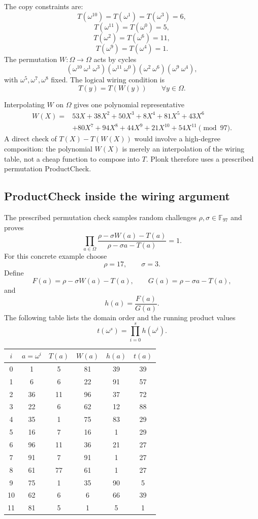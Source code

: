 \documentclass[11pt]{article}
\newcommand{\F}{\mathbb{F}}
\begin{document}
The copy constraints are:
\[
T(\omega^{10})=T(\omega^1)=T(\omega^3)=6,
\]
\[
T(\omega^{11})=T(\omega^0)=5,
\]
\[
T(\omega^2)=T(\omega^6)=11,
\]
\[
T(\omega^9)=T(\omega^4)=1.
\]
The permutation $W:\Omega\to\Omega$ acts by cycles
\[
    (\omega^{10}\ \omega^1\ \omega^3)
    (\omega^{11}\ \omega^0)
    (\omega^2\ \omega^6)
    (\omega^9\ \omega^4),
\]
with $\omega^5,\omega^7,\omega^8$ fixed. The logical wiring condition is
\[
    T(y)=T(W(y))
    \qquad\forall y\in\Omega.
\]

Interpolating $W$ on $\Omega$ gives one polynomial representative
\[
\begin{aligned}
W(X)={}&53X+38X^2+50X^3+8X^4+81X^5+43X^6\\
&+80X^7+94X^8+44X^9+21X^{10}+54X^{11}
\pmod{97}.
\end{aligned}
\]
A direct check of $T(X)-T(W(X))$ would involve a high-degree composition: the polynomial $W(X)$ is merely an interpolation of the wiring table, not a cheap function to compose into $T$. Plonk therefore uses a prescribed permutation ProductCheck.

\subsection{ProductCheck inside the wiring argument}

The prescribed permutation check samples random challenges $\rho,\sigma\in\F_{97}$ and proves
\[
    \prod_{a\in\Omega}
    \frac{\rho-\sigma W(a)-T(a)}{\rho-\sigma a-T(a)}=1.
\]
For this concrete example choose
\[
    \rho=17,
    \qquad
    \sigma=3.
\]
Define
\[
    F(a)=\rho-\sigma W(a)-T(a),
    \qquad
    G(a)=\rho-\sigma a-T(a),
\]
and
\[
    h(a)=\frac{F(a)}{G(a)}.
\]
The following table lists the domain order and the running product values
\[
    t(\omega^s)=\prod_{i=0}^{s}h(\omega^i).
\]

\begin{center}
\small
\begin{tabular}{c|c|c|c|c|c}
\toprule
$i$ & $a=\omega^i$ & $T(a)$ & $W(a)$ & $h(a)$ & $t(a)$\\
\midrule
0 & 1 & 5 & 81 & 39 & 39\\
1 & 6 & 6 & 22 & 91 & 57\\
2 & 36 & 11 & 96 & 37 & 72\\
3 & 22 & 6 & 62 & 12 & 88\\
4 & 35 & 1 & 75 & 83 & 29\\
5 & 16 & 7 & 16 & 1 & 29\\
6 & 96 & 11 & 36 & 21 & 27\\
7 & 91 & 7 & 91 & 1 & 27\\
8 & 61 & 77 & 61 & 1 & 27\\
9 & 75 & 1 & 35 & 90 & 5\\
10 & 62 & 6 & 6 & 66 & 39\\
11 & 81 & 5 & 1 & 5 & 1\\
\bottomrule
\end{tabular}
\end{center}
\end{document}
